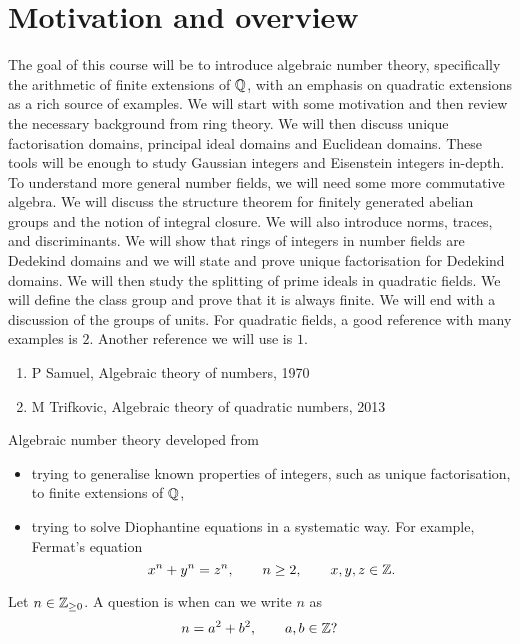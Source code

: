 \def\thm{subsection}







\section{Motivation and overview}


The goal of this course will be to introduce algebraic number theory, specifically the arithmetic of finite extensions of $ \mathbb{Q} $, with an emphasis on quadratic extensions as a rich source of examples. We will start with some motivation and then review the necessary background from ring theory. We will then discuss unique factorisation domains, principal ideal domains and Euclidean domains. These tools will be enough to study Gaussian integers and Eisenstein integers in-depth. To understand more general number fields, we will need some more commutative algebra. We will discuss the structure theorem for finitely generated abelian groups and the notion of integral closure. We will also introduce norms, traces, and discriminants. We will show that rings of integers in number fields are Dedekind domains and we will state and prove unique factorisation for Dedekind domains. We will then study the splitting of prime ideals in quadratic fields. We will define the class group and prove that it is always finite. We will end with a discussion of the groups of units. For quadratic fields, a good reference with many examples is $ 2 $. Another reference we will use is $ 1 $.
\begin{enumerate}
\item P Samuel, Algebraic theory of numbers, 1970
\item M Trifkovic, Algebraic theory of quadratic numbers, 2013
\end{enumerate}
Algebraic number theory developed from
\begin{itemize}
\item trying to generalise known properties of integers, such as unique factorisation, to finite extensions of $ \mathbb{Q} $,
\item trying to solve Diophantine equations in a systematic way. For example, Fermat's equation
$$ x^n + y^n = z^n, \qquad n \ge 2, \qquad x, y, z \in \mathbb{Z}. $$
\end{itemize}
Let $ n \in \mathbb{Z}_{\ge 0} $. A question is when can we write $ n $ as
$$ n = a^2 + b^2, \qquad a, b \in \mathbb{Z}? $$
